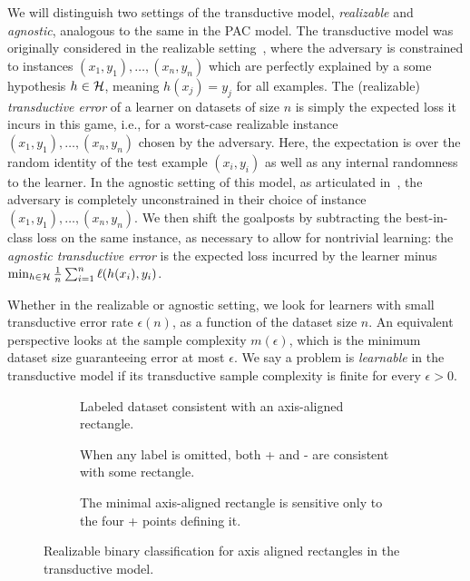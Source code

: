 We will distinguish two settings of the transductive model, \emph{realizable} and \emph{agnostic}, analogous to the same in the PAC model. The transductive model was originally considered in the realizable setting~\cite{haussler_predicting_1994,daniely_optimal_2014}, where the adversary is constrained to instances $(x_1,y_1), \ldots, (x_n,y_n)$ which are perfectly explained by a some hypothesis $h \in \mathcal{H}$, meaning $h(x_j) = y_j$ for all examples. The (realizable) \emph{transductive error}  of a learner on datasets of size $n$ is simply the expected loss it incurs in this game, i.e., for a worst-case realizable instance $(x_1,y_1), \ldots, (x_n,y_n)$ chosen by the adversary. Here, the expectation is over the random identity of the test example $(x_i,y_i)$ as well as any internal randomness to the learner. In the agnostic setting of this model, as articulated in~\cite{asilis_regularization_2024}, the adversary is completely unconstrained in their choice of instance $(x_1,y_1), \ldots, (x_n,y_n)$. We then shift the goalposts by subtracting the best-in-class loss on the same instance, as necessary to allow for nontrivial  learning: the \emph{agnostic transductive error} is the expected loss incurred by the learner minus $\min_{h \in \H} \frac{1}{n} \sum_{i=1}^n \ell(h(x_i),y_i)$.

Whether in the realizable or agnostic setting, we look for learners with small transductive error rate $\epsilon(n)$, as a function of the dataset size $n$. An equivalent perspective looks at the sample complexity $m(\epsilon)$, which is the minimum dataset size guaranteeing  error at most $\epsilon$. We say a problem is \emph{learnable} in the transductive model if its transductive sample complexity is finite for every $\epsilon > 0$.




\begin{figure}%
  \centering
    \begin{subfigure}{0.3\textwidth}
        \centering
        \scalebox{0.8}{}
        \caption{Labeled dataset consistent with an axis-aligned rectangle.}
        \label{fig:rectangles_a}
    \end{subfigure}
   \hfill %
    \begin{subfigure}{0.3\textwidth}
        \centering
        \scalebox{0.8}{}
        \caption{When any label is omitted, both + and - are consistent with some rectangle.}
        \label{fig:rectangles_b}
      \end{subfigure}
      \hfill
    \begin{subfigure}{0.3\textwidth}
      \centering
      \scalebox{0.8}{}
      \caption{The minimal axis-aligned rectangle is sensitive only to the four + points defining it.}
      \label{fig:rectangles_c}
    \end{subfigure}
    \caption{Realizable binary classification for axis aligned rectangles in the transductive model.}
    \label{fig:rectangles}
\end{figure}

